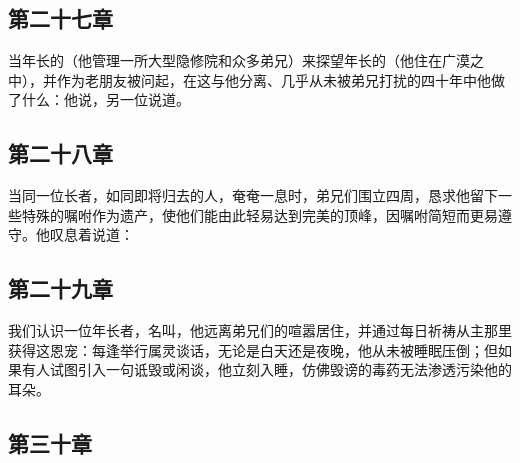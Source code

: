 
\subsection{第二十七章}

\par

当年长的（他管理一所大型隐修院和众多弟兄）来探望年长的（他住在广漠之中），并作为老朋友被问起，在这与他分离、几乎从未被弟兄打扰的四十年中他做了什么：他说，另一位说道。\par


\subsection{第二十八章}

\par

当同一位长者，如同即将归去的人，奄奄一息时，弟兄们围立四周，恳求他留下一些特殊的嘱咐作为遗产，使他们能由此轻易达到完美的顶峰，因嘱咐简短而更易遵守。他叹息着说道：\par


\subsection{第二十九章}

\par

我们认识一位年长者，名叫，他远离弟兄们的喧嚣居住，并通过每日祈祷从主那里获得这恩宠：每逢举行属灵谈话，无论是白天还是夜晚，他从未被睡眠压倒；但如果有人试图引入一句诋毁或闲谈，他立刻入睡，仿佛毁谤的毒药无法渗透污染他的耳朵。\par


\subsection{第三十章}

